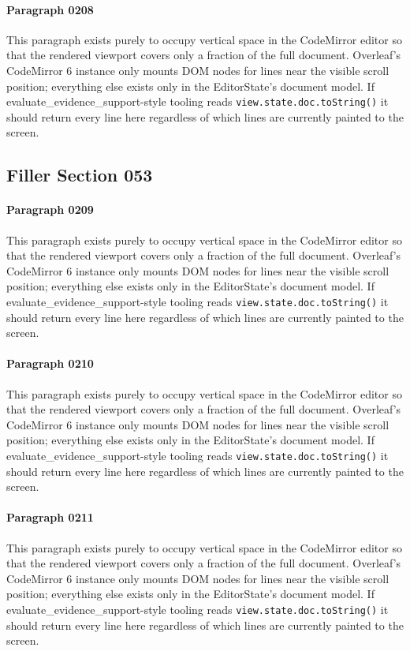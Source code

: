 \documentclass{article}
\begin{document}
\paragraph{Paragraph 0208}
This paragraph exists purely to occupy vertical space in the CodeMirror editor so that the rendered viewport covers only a fraction of the full document. Overleaf's CodeMirror 6 instance only mounts DOM nodes for lines near the visible scroll position; everything else exists only in the EditorState's document model. If evaluate\_evidence\_support-style tooling reads \texttt{view.state.doc.toString()} it should return every line here regardless of which lines are currently painted to the screen.

\subsection{Filler Section 053}
\paragraph{Paragraph 0209}
This paragraph exists purely to occupy vertical space in the CodeMirror editor so that the rendered viewport covers only a fraction of the full document. Overleaf's CodeMirror 6 instance only mounts DOM nodes for lines near the visible scroll position; everything else exists only in the EditorState's document model. If evaluate\_evidence\_support-style tooling reads \texttt{view.state.doc.toString()} it should return every line here regardless of which lines are currently painted to the screen.

\paragraph{Paragraph 0210}
This paragraph exists purely to occupy vertical space in the CodeMirror editor so that the rendered viewport covers only a fraction of the full document. Overleaf's CodeMirror 6 instance only mounts DOM nodes for lines near the visible scroll position; everything else exists only in the EditorState's document model. If evaluate\_evidence\_support-style tooling reads \texttt{view.state.doc.toString()} it should return every line here regardless of which lines are currently painted to the screen.

\paragraph{Paragraph 0211}
This paragraph exists purely to occupy vertical space in the CodeMirror editor so that the rendered viewport covers only a fraction of the full document. Overleaf's CodeMirror 6 instance only mounts DOM nodes for lines near the visible scroll position; everything else exists only in the EditorState's document model. If evaluate\_evidence\_support-style tooling reads \texttt{view.state.doc.toString()} it should return every line here regardless of which lines are currently painted to the screen.
\end{document}

